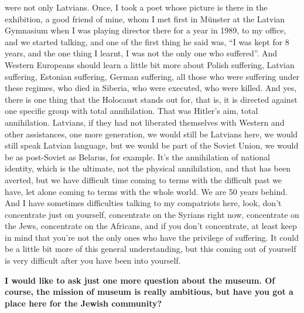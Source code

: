were not only Latvians. Once, I took a poet whose picture is there in the exhibition, a good friend of mine, whom I met first in Münster at the Latvian Gymnasium when I was playing director there for a year in 1989, to my office, and we started talking, and one of the first thing he said was, ``I was kept for 8 years, and the one thing I learnt, I was not the only one who suffered''. And Western Europeans should learn a little bit more about Polish suffering, Latvian suffering, Estonian suffering, German suffering, all those who were suffering under these regimes, who died in Siberia, who were executed, who were killed. And yes, there is one thing that the Holocaust stands out for, that is, it is directed against one specific group with total annihilation. That was Hitler's aim, total annihilation. Latvians, if they had not liberated themselves with Western and other assistances, one more generation, we would still be Latvians here, we would still speak Latvian language, but we would be part of the Soviet Union, we would be as post-Soviet as Belarus, for example. It's the annihilation of national identity, which is the ultimate, not the physical annihilation, and that has been averted, but we have difficult time coming to terms with the difficult past we have, let alone coming to terms with the whole world. We are 50 years behind. And I have sometimes difficulties talking to my compatriots here, look, don't concentrate just on yourself, concentrate on the Syrians right now, concentrate on the Jews, concentrate on the Africans, and if you don’t concentrate, at least keep in mind that you're not the only ones who have the privilege of suffering. It could be a little bit more of this general understanding, but this coming out of yourself is very difficult after you have been into yourself. 

\textbf{I would like to ask just one more question about the museum. Of course, the mission of museum is really ambitious, but have you got a place here for the Jewish community?}

